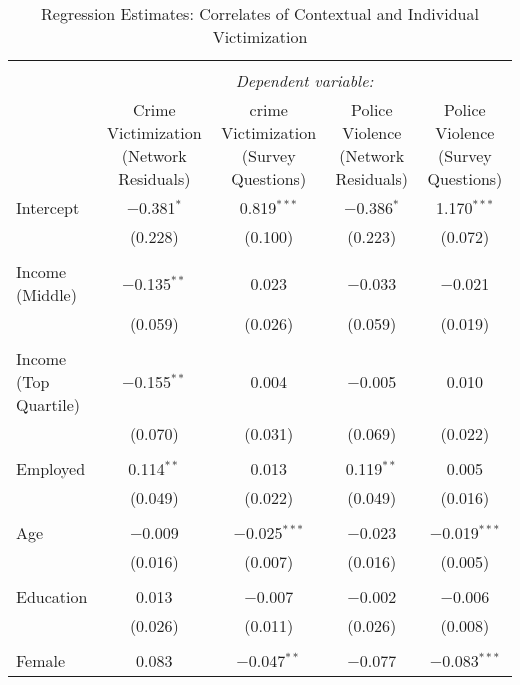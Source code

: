 
\begin{table}[!htbp] \centering 
  \caption{Regression Estimates: Correlates of Contextual and Individual Victimization} 
  \label{reg_net} 
\begin{tabular}{@{\extracolsep{5pt}}lcccc} 
\\[-1.8ex]\hline 
\hline \\[-1.8ex] 
 & \multicolumn{4}{c}{\textit{Dependent variable:}} \\ 
\cline{2-5} 
 & \multirow{2}{*}{\parbox{5cm}{Crime Victimization (Network Residuals)}} & \multirow{2}{*}{\parbox{5cm}{crime Victimization (Survey Questions)}} & \multirow{2}{*}{\parbox{5cm}{Police Violence (Network Residuals)}} & \multirow{2}{*}{\parbox{5cm}{Police Violence (Survey Questions)}} \\ 
\hline \\[-1.8ex] 
 Intercept & $-$0.381$^{*}$ & 0.819$^{***}$ & $-$0.386$^{*}$ & 1.170$^{***}$ \\ 
  & (0.228) & (0.100) & (0.223) & (0.072) \\ 
  & & & & \\ 
 Income (Middle) & $-$0.135$^{**}$ & 0.023 & $-$0.033 & $-$0.021 \\ 
  & (0.059) & (0.026) & (0.059) & (0.019) \\ 
  & & & & \\ 
 Income (Top Quartile) & $-$0.155$^{**}$ & 0.004 & $-$0.005 & 0.010 \\ 
  & (0.070) & (0.031) & (0.069) & (0.022) \\ 
  & & & & \\ 
 Employed & 0.114$^{**}$ & 0.013 & 0.119$^{**}$ & 0.005 \\ 
  & (0.049) & (0.022) & (0.049) & (0.016) \\ 
  & & & & \\ 
 Age & $-$0.009 & $-$0.025$^{***}$ & $-$0.023 & $-$0.019$^{***}$ \\ 
  & (0.016) & (0.007) & (0.016) & (0.005) \\ 
  & & & & \\ 
 Education & 0.013 & $-$0.007 & $-$0.002 & $-$0.006 \\ 
  & (0.026) & (0.011) & (0.026) & (0.008) \\ 
  & & & & \\ 
 Female & 0.083 & $-$0.047$^{**}$ & $-$0.077 & $-$0.083$^{***}$ \\ 

\end{tabular}
\end{table}
